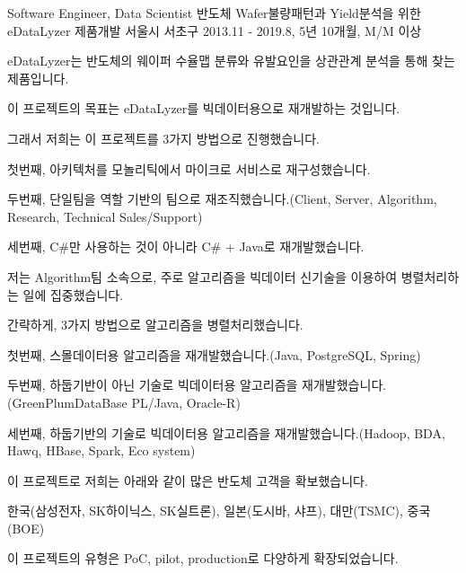 

\begin{cventries}

  \cventry
    {Software Engineer, Data Scientist} %
    {반도체 Wafer불량패턴과 Yield분석을 위한 eDataLyzer 제품개발} %
    {서울시 서초구} %
    {2013.11 - 2019.8, 5년 10개월, M/M 이상} %
    {
      \begin{cvitems} %
        \item {eDataLyzer는 반도체의 웨이퍼 수율맵 분류와 유발요인을 상관관계 분석을 통해 찾는 제품입니다.}
        \item {이 프로젝트의 목표는 eDataLyzer를 빅데이터용으로 재개발하는 것입니다.}
        \item {그래서 저희는 이 프로젝트를 3가지 방법으로 진행했습니다.}
        \item {첫번째, 아키텍처를 모놀리틱에서 마이크로 서비스로 재구성했습니다.}
        \item {두번째, 단일팀을 역할 기반의 팀으로 재조직했습니다.(Client, Server, Algorithm, Research, Technical Sales/Support)}
        \item {세번째, C\#만 사용하는 것이 아니라 C\# + Java로 재개발했습니다.}
        \item {저는 Algorithm팀 소속으로, 주로 알고리즘을 빅데이터 신기술을 이용하여 병렬처리하는 일에 집중했습니다.}
        \item {간략하게, 3가지 방법으로 알고리즘을 병렬처리했습니다.}
        \item {첫번째, 스몰데이터용 알고리즘을 재개발했습니다.(Java, PostgreSQL, Spring)}
        \item {두번째, 하둡기반이 아닌 기술로 빅데이터용 알고리즘을 재개발했습니다.(GreenPlumDataBase PL/Java, Oracle-R)}
        \item {세번째, 하둡기반의 기술로 빅데이터용 알고리즘을 재개발했습니다.(Hadoop, BDA, Hawq, HBase, Spark, Eco system)}
        \item {이 프로젝트로 저희는 아래와 같이 많은 반도체 고객을 확보했습니다.}
        \item {한국(삼성전자, SK하이닉스, SK실트론), 일본(도시바, 샤프), 대만(TSMC), 중국(BOE)}
        \item {이 프로젝트의 유형은 PoC, pilot, production로 다양하게 확장되었습니다.}
      \end{cvitems}
    }


\end{cventries}
